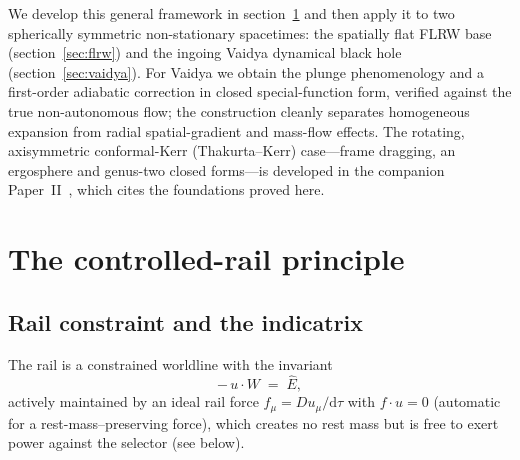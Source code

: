 \documentclass[12pt]{iopart}
\newcommand{\Ehat}{\hat E}
\newcommand{\dd}{\mathrm{d}}
\begin{document}
We develop this general framework in section~\ref{sec:principle} and then apply it to two
spherically symmetric non-stationary spacetimes: the spatially flat FLRW base
(section~\ref{sec:flrw}) and the ingoing Vaidya dynamical black hole
(section~\ref{sec:vaidya}). For Vaidya we obtain the plunge phenomenology and a
first-order adiabatic correction in closed special-function form, verified against the
true non-autonomous flow; the construction cleanly separates homogeneous expansion from
radial spatial-gradient and mass-flow effects. The rotating, axisymmetric conformal-Kerr
(Thakurta--Kerr) case---frame dragging, an ergosphere and genus-two closed forms---is
developed in the companion Paper~II~\cite{PaperTwo}, which cites the foundations proved
here.

\section{The controlled-rail principle}
\label{sec:principle}

\subsection{Rail constraint and the indicatrix}
\label{sec:indicatrix}
The rail is a constrained worldline with the invariant
\begin{equation}
    -\,u\cdot W \;=\; \Ehat ,
    \label{eq:rail}
\end{equation}
actively maintained by an ideal rail force $f_\mu=Du_\mu/\dd\tau$ with
$f\cdot u=0$ (automatic for a rest-mass--preserving force), which creates no rest
mass but is free to exert power against the selector (see below).
\end{document}
